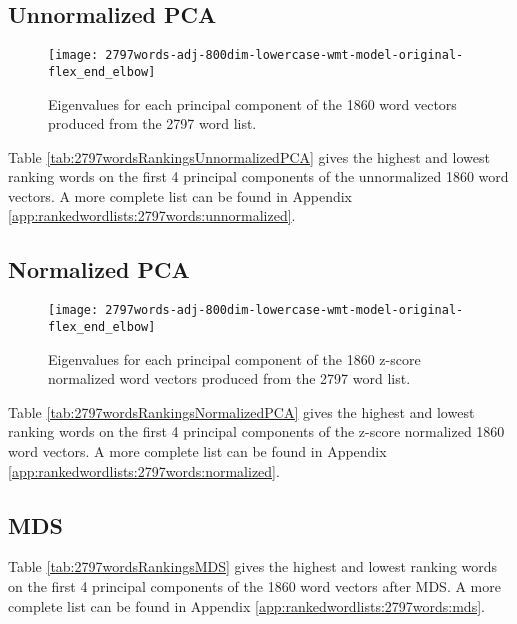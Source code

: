 \documentclass[eric_thesis.tex]{subfiles}
\begin{document}
\subsection{Unnormalized PCA}



\begin{figure}[tbp]
    \texttt{[image: 2797words-adj-800dim-lowercase-wmt-model-original-flex\_end\_elbow]}
    \caption{Eigenvalues for each principal component of the 1860 word vectors
    produced from the 2797 word list.}
    \label{fig:2797wordsunnormalizedpcaeigenvalues}
\end{figure}

Table \ref{tab:2797wordsRankingsUnnormalizedPCA} gives the highest and lowest
ranking words on the first 4 principal components of the unnormalized 1860 word 
vectors. A more complete list can be found in Appendix 
\ref{app:rankedwordlists:2797words:unnormalized}.


\subsection{Normalized PCA}



\begin{figure}[tbp]
    \texttt{[image: 2797words-adj-800dim-lowercase-wmt-model-original-flex\_end\_elbow]}
    \caption{Eigenvalues for each principal component of the 1860 z-score 
    normalized word vectors produced from the 2797 word list.}
    \label{fig:2797wordsnormalizedpcaeigenvalues}
\end{figure}

Table \ref{tab:2797wordsRankingsNormalizedPCA} gives the highest and lowest
ranking words on the first 4 principal components of the z-score normalized 1860
word vectors. A more complete list can be found in Appendix 
\ref{app:rankedwordlists:2797words:normalized}.

\subsection{MDS}



Table \ref{tab:2797wordsRankingsMDS} gives the highest and lowest
ranking words on the first 4 principal components of the 1860 word 
vectors after MDS. A more complete list can be found in Appendix 
\ref{app:rankedwordlists:2797words:mds}.
\end{document}
